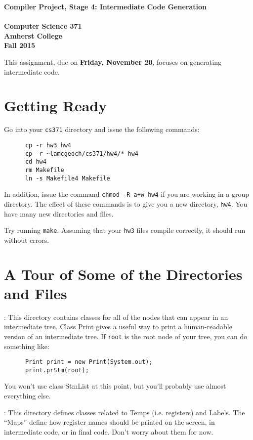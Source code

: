 \documentclass[11pt]{article}
\begin{document}
\begin{center}
\Large \bf Compiler Project, Stage 4: Intermediate Code Generation\\ \mbox{} \\
\large Computer Science 371 \\
\large Amherst College \\
\large Fall 2015
\end{center}

This assignment, due on {\bf Friday, November 20}, focuses on generating intermediate code.

\section{Getting Ready}

Go into your \verb'cs371' directory and issue the following commands:
\begin{verbatim}
      cp -r hw3 hw4                  
      cp -r ~lamcgeoch/cs371/hw4/* hw4
      cd hw4
      rm Makefile
      ln -s Makefile4 Makefile
\end{verbatim}
In addition, issue the command \verb'chmod -R a+w hw4' if you are working in a group directory.
The effect of these commands is to give you a new directory, \verb'hw4'.  You have many new directories and files.

Try running \verb'make'.  Assuming that your \verb'hw3' files compile correctly, it should run without errors.

\section{A Tour of Some of the Directories and Files}

\mbox{}\par{}:  This directory contains classes for all of the nodes that can appear in an intermediate tree.  Class Print gives a useful way to print a human-readable version of an intermediate tree.  If \verb'root' is the root node of your tree, you can do something like:
\begin{verbatim}
      Print print = new Print(System.out);
      print.prStm(root);
\end{verbatim}
You won't use class StmList at this point, but you'll probably use almost everything else.

\mbox{}\par{}:  This directory defines classes related to Temps (i.e. registers) and Labels.  The ``Maps'' define how register names should be printed on the screen, in intermediate code, or in final code.  Don't worry about them for now.
\end{document}
